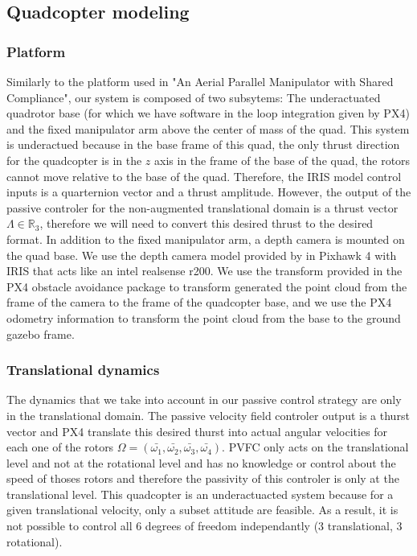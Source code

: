 \subsection{Quadcopter modeling}
\subsubsection{Platform}
Similarly to the platform used in "An Aerial Parallel Manipulator with Shared Compliance", our system is composed of two subsytems: The underactuated quadrotor base (for which we have software in the loop integration given by PX4) and the fixed manipulator arm above the center of mass of the quad.
This system is underactued because in the base frame of this quad, the only thrust direction for the quadcopter is in the $z$ axis in the frame of the base of the quad, the rotors cannot move relative to the base of the quad. Therefore, the IRIS model control inputs is a quarternion vector and a thrust amplitude. However, the output of the passive controler for the non-augmented translational domain is a thrust vector $\Lambda \in\mathbb R_3 $, therefore we will need to convert this desired thrust to the desired format.
In addition to the fixed manipulator arm, a depth camera is mounted on the quad base. We use the depth camera model provided by in Pixhawk 4 with IRIS that acts like an intel realsense r200. We use the transform provided in the PX4 obstacle avoidance package to transform generated the point cloud from the frame of the camera to the frame of the quadcopter base, and we use the PX4 odometry information to transform the point cloud from the base to the ground gazebo frame.

\subsubsection{Translational dynamics}

The dynamics that we take into account in our passive control strategy are only in the translational domain. The passive velocity field controler output is a thurst vector and PX4 translate this desired thurst into actual angular velocities for each one of the rotors 
$\Omega = (\bar{\omega_1}, \bar{\omega_2}, \bar{\omega_3}, \bar{\omega_4})$. PVFC only acts on the translational level and not at the rotational level and has no knowledge or control about the speed of thoses rotors and therefore the passivity of this controler is only at the translational level. 
This quadcopter is an underactuacted system because for a given translational velocity, only a subset attitude are feasible. As a result, it is not possible to control all 6 degrees of freedom independantly (3 translational, 3 rotational).
 
